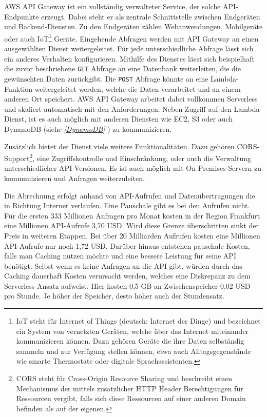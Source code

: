 AWS API Gateway ist ein vollständig verwalteter Service, der solche API-Endpunkte erzeugt.
Dabei steht er als zentrale Schnittstelle zwischen Endgeräten und Backend-Diensten.
Zu den Endgeräten zählen Webanwendungen, Mobilgeräte oder auch
IoT\footnote{IoT steht für Internet of Things (deutsch: Internet der Dinge) und bezeichnet ein System von vernetzten Geräten, welche
 über das Internet miteinander kommunizieren können. Dazu gehören Geräte die ihre Daten selbständig sammeln und zur Verfügung stellen können,
 etwa auch Alltagsgegenstände wie smarte Thermostate oder digitale Sprachassistenten. } Geräte.
Eingehende Abfragen werden mit API Gateway an einen ausgewählten Dienst weitergeleitet.
Für jede unterschiedliche Abfrage lässt sich ein anderes Verhalten konfigurieren.
Mithilfe des Dienstes lässt sich beispielhaft die zuvor beschriebene \verb+GET+ Abfrage an eine Datenbank weiterleiten, die die gewünschten Daten zurückgibt.
Die \verb+POST+ Abfrage könnte an eine Lambda-Funktion weitergeleitet werden, welche die Daten verarbeitet und an einem anderen Ort speichert.
AWS API Gateway arbeitet dabei vollkommen Serverless und skaliert automatisch mit den Anforderungen. Neben Zugriff auf den Lambda-Dienst, ist es auch möglich
mit anderen Diensten wie EC2, S3 oder auch DynamoDB (siehe \textit{\ref{DynamoDB} }) zu kommunizieren.

Zusätzlich bietet der Dienst viele weitere Funktionalitäten. Dazu gehören CORS-Support\footnote{CORS steht für Cross-Origin Resource Sharing und
beschreibt einen Mechanismus der mittels zusätzlicher HTTP Header Berechtigungen für Ressourcen vergibt, falls sich diese Ressourcen auf einer anderen
Domain befinden als auf der eigenen.}, eine Zugriffskontrolle und Einschränkung, oder auch die Verwaltung unterschiedlicher
API-Versionen. Es ist auch möglich mit On Premises Servern zu kommunizieren und Anfragen weiterzuleiten.\cite{APIGateway}

Die Abrechnung erfolgt anhand von API-Aufrufen und Datenübertragungen die in Richtung Internet verlaufen. Eine Pauschale gibt es bei den Aufrufen nicht.
Für die ersten 333 Millionen Anfragen pro Monat kosten in der Region Frankfurt eine Millionen API-Aufrufe 3,70 USD.
Wird diese Grenze überschritten sinkt der Preis in weiteren Etappen. Bei über 20 Milliarden Aufrufen kosten eine Millionen API-Aufrufe nur noch 1,72 USD.
Darüber hinaus entstehen pauschale Kosten, falls man Caching nutzen möchte und eine bessere Leistung für seine API benötigt.
Selbst wenn es keine Anfragen an die API gibt, würden durch das Caching dauerhaft Kosten verursacht werden, welches eine Diskrepanz zu dem Serverless Ansatz aufweist.
Hier kosten 0,5 GB an Zwischenspeicher 0,02 USD pro Stunde. Je höher der Speicher, desto höher auch der Stundensatz.
\cite{APIGWPrice}

